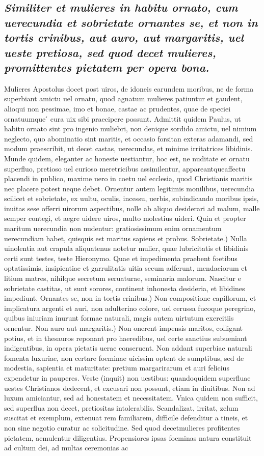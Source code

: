 \documentclass{article}
\begin{document}
\begin{pages}
\subsection*{\textit{Similiter et mulieres in habitu ornato, cum uerecundia et sobrietate ornantes se, et non in tortis crinibus, aut auro, aut margaritis, uel ueste pretiosa, sed quod decet mulieres, promittentes pietatem per opera bona. }}\pstart Mulieres Apostolus docet post uiros, de idoneis earundem moribus, ne de forma superbiant amictu uel ornatu, quod agnatum mulieres patiuntur et gaudent, alioqui non pessimae, imo et bonae, castae ac prudentes, quae de speciei ornatuumque ́ cura uix sibi praecipere possunt. Admittit quidem Paulus, ut habitu ornato sint pro ingenio muliebri, non denique  sordido amictu, uel nimium neglecto, quo abominatio sint maritis, et occasio forsitan exteras adamandi, sed modum praescribit, ut decet castas, uerecundas, et minime irritatrices libidinis. Munde quidem, eleganter ac honeste uestiantur, hoc est, ne nuditate et ornatu superfluo, pretioso uel curioso meretricibus assimilentur, appareantqueaffectu placendi in publico, maxime uero in coetu uel ecclesia, quod Christianis maritis nec placere potest neque  debet. Ornentur autem legitimis monilibus, uerecundia scilicet et sobrietate, ex uultu, oculis, incessu, uerbis, subindicando moribus ipsis, inuitas sese offerri uirorum aspectibus, nolle ab aliquo desiderari ad malum, malle semper contegi, et aegre uidere uiros, multo molestius uideri. Quin et propter maritum uerecundia non nudentur: gratiosissimum enim ornamentum uerecundiam habet, quisquis est maritus sapiens et probus. Sobrietate.) Nulla uinolentia aut crapula aliquatenus notetur mulier, quae lubricitatis et libidinis certi sunt testes, teste Hieronymo. Quae et impedimenta praebent foetibus optatissimis, insipientiae et garrulitatis uitia secum adferunt, mendaciorum et litium matres, nihilque  secretum seruaturae, seminaria malorum. Nascitur e sobrietate castitas, ut sunt sorores, continent inhonesta desideria, et libidines impediunt. Ornantes se, non in tortis crinibus.) Non compositione capillorum, et implicatura argenti et auri, non adulterino colore, uel cerussa fucoque  peregrino, quibus iniuriam inurunt formae naturali, magis autem uirtutum exercitiis ornentur. Non auro aut margaritis.) Non onerent impensis maritos, colligant potius, et in thesauros reponant pro haeredibus, uel certe sanctius subueniant indigentibus, in opera pietatis uerae conseruent. Non addant superbiae naturali fomenta luxuriae, non certare foeminae uicissim optent de sumptibus, sed de modestia, sapientia et maturitate: pretium margarirarum et auri felicius expendetur in pauperes. Veste (inquit) non uestibus: quandoquidem superfluae uestes Christianos dedecent, et excusari non possunt, etiam in diuitibus. Non ad luxum amiciantur, sed ad honestatem et necessitatem. Vnica quidem non sufficit, sed superflua non decet, pretiositas intolerabilis. Scandalizat, irritat, zelum suscitat et exemplum, extenuat rem familiarem, difficile defenditur a tineis, et non sine negotio curatur ac solicitudine. Sed quod decetmulieres profitentes pietatem, aemulentur diligentius. Propensiores ipsas foeminas natura constituit ad cultum dei, ad multas ceremonias ac 
\end{pages}
\end{document}
